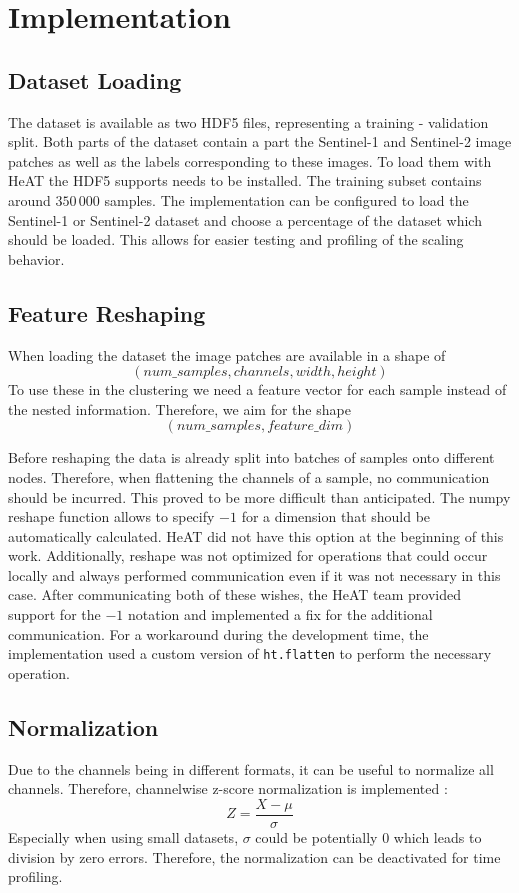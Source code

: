 \section{Implementation}
\label{sec:implementation}

\subsection{Dataset Loading}
\label{subsec:dataset_loading}
The dataset is available as two \gls{HDF5} files, representing a training - validation split.
Both parts of the dataset contain a part the Sentinel-1 and Sentinel-2 image patches as well as the labels corresponding to these images.
To load them with \gls{HeAT} the \gls{HDF5} supports needs to be installed.
The training subset contains around \(350\,000\) samples.
The implementation can be configured to load the Sentinel-1 or Sentinel-2 dataset and choose a percentage of the dataset which should be loaded.
This allows for easier testing and profiling of the scaling behavior.


\subsection{Feature Reshaping}
\label{subsec:feature_reshaping}
When loading the dataset the image patches are available in a shape of \[(num\_samples, channels, width, height)\]
To use these in the clustering we need a feature vector for each sample instead of the nested information. Therefore,
we aim for the shape \[(num\_samples, feature\_dim)\]

Before reshaping the data is already split into batches of samples onto different nodes. Therefore, when flattening the channels of a sample, no communication should be incurred.
This proved to be more difficult than anticipated. The \gls{numpy} reshape function allows to specify \(-1\) for a dimension that should be automatically calculated.
\gls{HeAT} did not have this option at the beginning of this work.
Additionally, reshape was not optimized for operations that could occur locally and always performed communication even
if it was not necessary in this case. After communicating both of these wishes, the \gls{HeAT} team provided support for the \(-1\) notation and
implemented a fix for the additional communication.
For a workaround during the development time, the implementation used a custom version of \lstinline{ht.flatten} to perform the necessary operation.

\subsection{Normalization}
\label{subsec:normalization}
Due to the channels being in different formats, it can be useful to normalize all channels.
Therefore, channelwise z-score normalization is implemented \cite{wooldridge_introductory_2012}:
\[Z = \frac{X - \mu}{\sigma}\]
Especially when using small datasets, \(\sigma\) could be potentially \(0\) which leads to division by zero errors.
Therefore, the normalization can be deactivated for time profiling.

